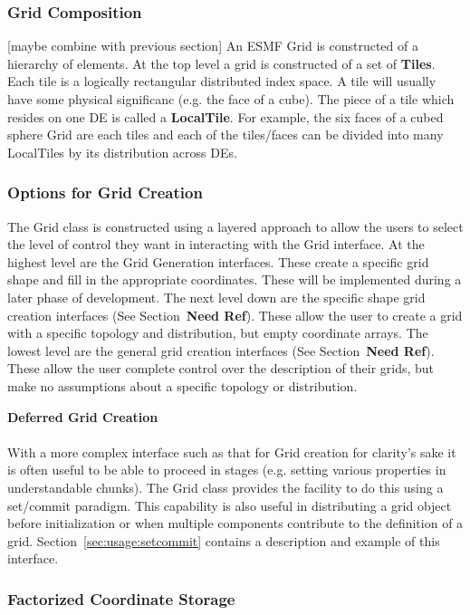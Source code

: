 \subsubsection{Grid Composition}\label{sec:gridcomp}
[maybe combine with previous section]
An ESMF Grid is constructed of a hierarchy of elements. At the top
level a grid is constructed of a set of {\bf Tiles}. Each tile is a logically
rectangular distributed index space. A tile will usually have some
physical significanc (e.g. the face of a cube). The piece of a tile
which resides on one DE is called a {\bf LocalTile}. For example, the six
faces of a cubed sphere Grid are each tiles and each of 
the tiles/faces can be divided into many LocalTiles by its
distribution across DEs. 

\subsubsection{Options for Grid Creation} 

The Grid class is constructed using a layered approach to allow the 
users to select the level of control they want in interacting with
the Grid interface. At the highest level are the Grid Generation interfaces. 
These create a specific grid shape and fill in the appropriate coordinates. 
These will be implemented during a later phase of development. The
next level down are the specific shape grid creation interfaces (See Section~\textbf{Need Ref}). 
These allow the user to create a grid with a specific topology and 
distribution, but empty coordinate arrays. The lowest level are
the general grid creation interfaces (See Section~\textbf{Need Ref}). These allow the user
complete control over the description of their grids, but
make no assumptions about a specific topology or distribution. 

{\bf Deferred Grid Creation}\\
[maybe combine with previous section]\\
 With a more complex interface such as that for Grid creation
for clarity's sake it is often useful to be able to proceed in stages
(e.g. setting various properties in understandable chunks). The 
Grid class provides the facility to do this using a set/commit paradigm.
This capability is also useful in distributing a grid object before
initialization or when multiple components contribute to the 
definition of a grid. Section~\ref{sec:usage:setcommit}
contains a description and example of this interface. 

\subsubsection{Factorized Coordinate Storage}


